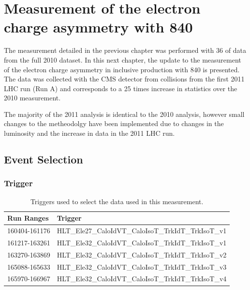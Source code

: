 \chapter{ 
Measurement of the electron charge asymmetry with \unit{840}{\invpb} }

The measurement detailed in the previous chapter was performed with
\unit{36}{\invpb} of data from the full 2010 dataset. 
In this next chapter, the update to the measurement of the electron charge asymmetry in
inclusive \inclusiveWe production with \unit{840}{\invpb} is presented. 
The data was collected with the \ac{CMS} detector from collisions from the
first 2011 \ac{LHC} run (Run A) and corresponds to a 25 times increase in
statistics over the 2010 measurement.


The majority of the 2011 analysis is identical to the 2010 analysis,
however small changes to the metheodolgy have been implemented due to changes
in the luminosity and the increase in data in the 2011 \ac{LHC} run.

\section{Event Selection}
\subsection{Trigger}


\begin{table}[htbp]
  \begin{center}
    \leavevmode
     \begin{tabular}{ll} 
      Run Ranges & Trigger  \\
     \hline
     160404-161176 & HLT\_Ele27\_CaloIdVT\_CaloIsoT\_TrkIdT\_TrkIsoT\_v1  \\
     161217-163261 & HLT\_Ele32\_CaloIdVT\_CaloIsoT\_TrkIdT\_TrkIsoT\_v1  \\
     163270-163869 & HLT\_Ele32\_CaloIdVT\_CaloIsoT\_TrkIdT\_TrkIsoT\_v2  \\
     165088-165633 & HLT\_Ele32\_CaloIdVT\_CaloIsoT\_TrkIdT\_TrkIsoT\_v3  \\
     165970-166967 & HLT\_Ele32\_CaloIdVT\_CaloIsoT\_TrkIdT\_TrkIsoT\_v4  \\
     \end{tabular}

  \caption{Triggers used to select the data used in this measurement.}
  \label{asym840:triggers}

   \end{center}
\end{table}


